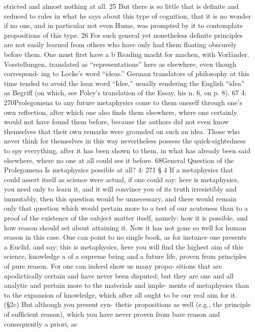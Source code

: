 stricted and almost nothing at all. 25 But there is so little that is deﬁnite
and reduced to rules in what he says about this type of cognition, that it
is no wonder if no one, and in particular not even Hume, was prompted
by it to contemplate propositions of this type. 26 For such general yet
nonetheless deﬁnite principles are not easily learned from others who
have only had them ﬂoating obscurely before them. One must ﬁrst have
a
b
Reading macht for machen, with Vorländer.
Vorstellungen, translated as “representations” here as elsewhere, even though correspond-
ing to Locke’s word “ideas.” German translators of philosophy at this time tended to
avoid the loan word “Idee,” usually rendering the English “idea” as Begriff (on which, see
Poley’s translation of the Essay, his n. 6, on p. 8).
67
4: 270Prolegomena to any future metaphysics
come to them oneself through one’s own reﬂection, after which one also
ﬁnds them elsewhere, where one certainly would not have found them
before, because the authors did not even know themselves that their
own remarks were grounded on such an idea. Those who never think for
themselves in this way nevertheless possess the quick-sightedness to spy
everything, after it has been shown to them, in what has already been
said elsewhere, where no one at all could see it before.
68General Question of the Prolegomena
Is metaphysics possible at all?
4: 271
§ 4
If a metaphysics that could assert itself as science were actual, if one could
say: here is metaphysics, you need only to learn it, and it will convince
you of its truth irresistibly and immutably, then this question would be
unnecessary, and there would remain only that question which would
pertain more to a test of our acuteness than to a proof of the existence of
the subject matter itself, namely: how it is possible, and how reason should
set about attaining it. Now it has not gone so well for human reason in
this case. One can point to no single book, as for instance one presents
a Euclid, and say: this is metaphysics, here you will ﬁnd the highest aim
of this science, knowledge a of a supreme being and a future life, proven
from principles of pure reason. For one can indeed show us many propo-
sitions that are apodictically certain and have never been disputed; but
they are one and all analytic and pertain more to the materials and imple-
ments of metaphysics than to the expansion of knowledge, which after
all ought to be our real aim for it. (§2c) But although you present syn-
thetic propositions as well (e.g., the principle of sufﬁcient reason), which
you have never proven from bare reason and consequently a priori, as
